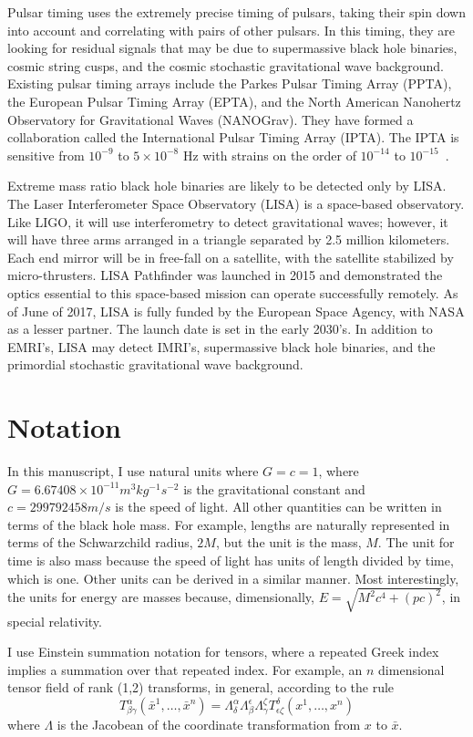 Pulsar timing uses the extremely precise timing of pulsars, taking their spin down into account and correlating with pairs of other pulsars. In this timing, they are looking for residual signals that may be due to supermassive black hole binaries, cosmic string cusps, and the cosmic stochastic gravitational wave background. Existing pulsar timing arrays include the Parkes Pulsar Timing Array (PPTA), the European Pulsar Timing Array (EPTA), and the North American Nanohertz Observatory for Gravitational Waves (NANOGrav). They have formed a collaboration called the International Pulsar Timing Array (IPTA). The IPTA is sensitive from $10^{-9}$ to $5\times10^{-8}$ Hz with strains on the order of $10^{-14}$ to $10^{-15}$~\cite{hobbs_dai}.



Extreme mass ratio black hole binaries are likely to be detected only by LISA. The Laser Interferometer Space Observatory (LISA) is a space-based observatory. Like LIGO, it will use interferometry to detect gravitational waves; however, it will have three arms arranged in a triangle separated by 2.5 million kilometers. Each end mirror will be in free-fall on a satellite, with the satellite stabilized by micro-thrusters. LISA Pathfinder was launched in 2015 and demonstrated the optics essential to this space-based mission can operate successfully remotely. As of June of 2017, LISA is fully funded by the European Space Agency, with NASA as a lesser partner. The launch date is set in the early 2030's. In addition to EMRI's, LISA may detect IMRI's, supermassive black hole binaries, and the primordial stochastic gravitational wave background.


\section{Notation}
In this manuscript, I use natural units where $G=c=1$, where $G=6.67408\times 10^{-11} m^3kg^{-1}s^{-2}$ is the gravitational constant and $c=299792458 m/s$ is the speed of light. All other quantities can be written in terms of the black hole mass. For example, lengths are naturally represented in terms of the Schwarzchild radius, $2M$, but the unit is the mass, $M$. The unit for time is also mass because the speed of light has units of length divided by time, which is one. Other units can be derived in a similar manner. Most interestingly, the units for energy are masses because, dimensionally, $E=\sqrt{M^2c^4+(pc)^2}$, in special relativity. 

I use Einstein summation notation for tensors, where a repeated Greek index implies a summation over that repeated index. For example, an $n$ dimensional tensor field of rank (1,2) transforms, in general, according to the rule
\begin{equation}
  T^\alpha_{\beta\gamma}(\bar{x}^1,\ldots,\bar{x}^n)=\Lambda^\alpha_\delta\Lambda^\epsilon_\beta\Lambda^\zeta_\gamma T^\delta_{\epsilon\zeta}(x^1,\ldots,x^n)
\end{equation}
where $\Lambda$ is the Jacobean of the coordinate transformation from $x$ to $\bar{x}$. 

